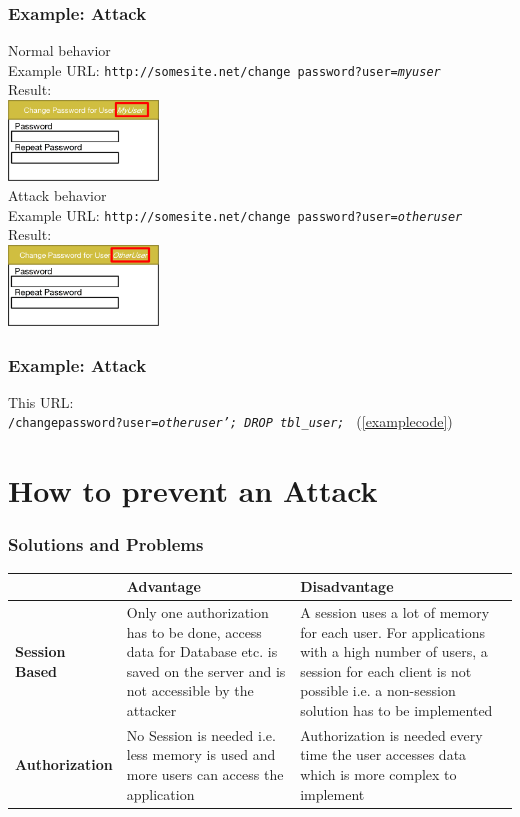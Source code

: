 \documentclass[aspectratio=169]{beamer}
\begin{document}
\begin{frame}
  \frametitle{Example: Attack}
  \begin{multicols}{2}
   \LARGE{Normal behavior}\\\normalsize Example URL: \small\texttt{http://somesite.net/change password?user=\textit{myuser}}\\
   \normalsize{Result:}\\\includegraphics[width=4cm]{example_web_s1}\\
   \LARGE{Attack behavior}\\\normalsize Example URL: \small\texttt{http://somesite.net/change password?user=\textit{otheruser}}\\
   \normalsize{Result:}\\\includegraphics[width=4cm]{example_web_s2}\\
  \end{multicols}
\end{frame}

\begin{frame}
  \frametitle{Example: Attack}
  This URL:\\ \texttt{/changepassword?user=\textit{otheruser'; DROP tbl\_user; }} (\ref{examplecode})
\end{frame}


\section{How to prevent an Attack}

\begin{frame}
  \frametitle{Solutions and Problems}
\tiny
  \begin{tabular}{|l|p{4cm}|p{4cm}|}
    \hline
    & \textbf{Advantage} & \textbf{Disadvantage} \\\hline
    \textbf{Session Based} & Only one authorization has to be done, access data for Database etc. is saved on the server and is not accessible by the attacker & A session uses a lot of memory for each user. For applications with a high number of users, a session for each client is not possible i.e. a non-session solution has to be implemented \\\hline
    \textbf{Authorization} & No Session is needed i.e. less memory is used and more users can access the application & Authorization is needed every time the user accesses data which is more complex to implement\\\hline
  \end{tabular}
\end{frame}
\end{document}
